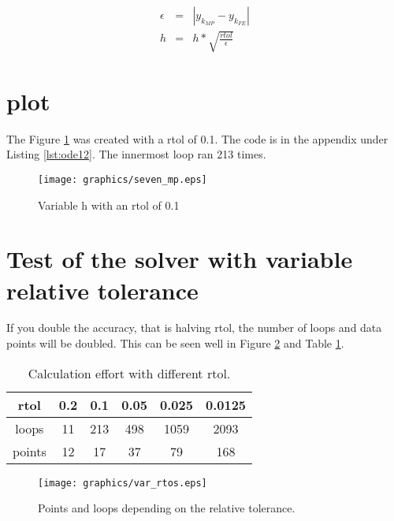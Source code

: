 		\begin{eqnarray}
			\epsilon  &=& \left| y_{k_{MP}} - y_{k_{FE}} \right| \label{eq:3}\\
			h &=& h * \sqrt{\frac{rtol}{\epsilon}} \label{eq:4}
		\end{eqnarray}
		

	
	\section{plot}
	The Figure \ref{fig:femp} was created with a rtol of 0.1. The code is in the appendix under Listing \ref{lst:ode12}. The innermost loop ran 213 times.
	
		\begin{figure}[H]
			\centering
			\texttt{[image: graphics/seven\_mp.eps]}
			\caption{Variable h with an rtol of 0.1}
			\label{fig:femp}
		\end{figure}
	
	\section{Test of the solver with variable relative tolerance}
	If you double the accuracy, that is halving rtol, the number of loops and data points will be doubled.	This can be seen well in Figure \ref{fig:var_rtol} and Table \ref{tb:rtol}.
		
		\begin{table}[H]
			\begin{center}
			\begin{tabular}{c|ccccc}
				
				rtol 	& 0.2 & 0.1 & 0.05 & 0.025 & 0.0125\\ \hline
				loops	& 11 & 213 & 498 & 1059 & 2093 \\
				points  & 12 & 17 & 37 & 79 & 168 
				
			\end{tabular}
			\caption{Calculation effort with different rtol.}
			\label{tb:rtol}
			\end{center}
		\end{table}
	
		\begin{figure}[H]
			\centering
			\texttt{[image: graphics/var\_rtos.eps]}
			\caption{Points and loops depending on the relative tolerance.}
			\label{fig:var_rtol}
		\end{figure}



